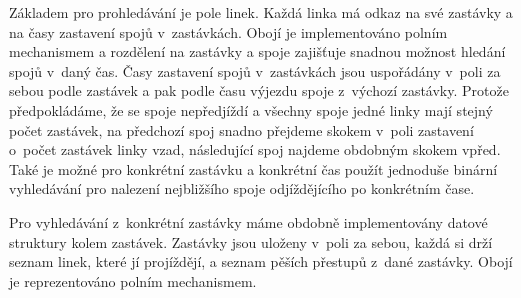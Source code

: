 Základem pro prohledávání je pole linek. Každá linka má odkaz na své zastávky a
na časy zastavení spojů v~zastávkách. Obojí je implementováno polním mechanismem
a rozdělení na zastávky a spoje zajišťuje snadnou možnost hledání spojů v~daný
čas. Časy zastavení spojů v~zastávkách jsou uspořádány v~poli za sebou podle
zastávek a pak podle času výjezdu spoje z~výchozí zastávky. Protože
předpokládáme, že se spoje nepředjíždí a všechny spoje jedné linky mají stejný
počet zastávek, na předchozí spoj snadno přejdeme skokem v~poli zastavení
o~počet zastávek linky vzad, následující spoj najdeme obdobným skokem vpřed. Také
je možné pro konkrétní zastávku a konkrétní čas použít jednoduše binární
vyhledávání pro nalezení nejbližšího spoje odjíždějícího po konkrétním čase. 

Pro vyhledávání z~konkrétní zastávky máme obdobně implementovány datové
struktury kolem zastávek. Zastávky jsou uloženy v~poli za sebou, každá si drží
seznam linek, které jí projíždějí, a seznam pěších přestupů z~dané zastávky. 
Obojí je reprezentováno polním mechanismem.   

